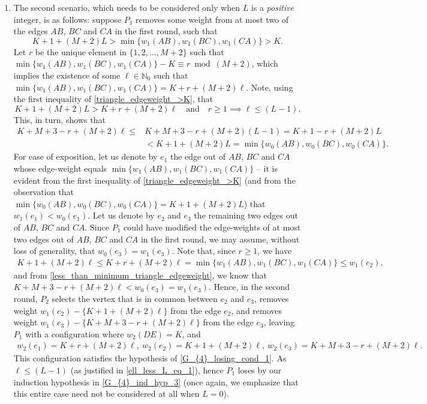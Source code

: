 \documentclass[11pt,reqno]{amsart}
\theoremstyle{definition}
\theoremstyle{definition}
\begin{document}
\begin{enumerate}
\item The second scenario, which needs to be considered only when $L$ is a \emph{positive} integer, is as follows: suppose $P_{1}$ removes some weight from at most two of the edges $AB$, $BC$ and $CA$ in the first round, such that 
\begin{equation}
K+1+(M+2)L > \min\{w_{1}(AB),w_{1}(BC),w_{1}(CA)\} > K.\label{triangle_edgeweight_>K}
\end{equation}
\sloppy Let $r$ be the unique element in $\{1,2,\ldots,M+2\}$ such that $\min\{w_{1}(AB),w_{1}(BC),w_{1}(CA)\}-K \equiv r \bmod (M+2)$, which implies the existence of some $\ell \in \mathbb{N}_{0}$ such that $\min\{w_{1}(AB),w_{1}(BC),w_{1}(CA)\}=K+r+(M+2)\ell$. Note, using the first inequality of \eqref{triangle_edgeweight_>K}, that
\begin{equation}
K+1+(M+2)L > K+r+(M+2)\ell \quad \text{and} \quad r \geqslant 1 \implies \ell \leqslant (L-1).\label{ell_less_L_eq_1}
\end{equation}
This, in turn, shows that 
\begin{align}
K+M+3-r+(M+2)\ell \leqslant{}& K+M+3-r+(M+2)(L-1)=K+1-r+(M+2)L\nonumber\\
{}&< K+1+(M+2)L=\min\{w_{0}(AB),w_{0}(BC),w_{0}(CA)\}.\label{less_than_minimum_triangle_edgeweight}
\end{align}
For ease of exposition, let us denote by $e_{1}$ the edge out of $AB$, $BC$ and $CA$ whose edge-weight equals $\min\{w_{1}(AB),w_{1}(BC),w_{1}(CA)\}$ -- it is evident from the first inequality of \eqref{triangle_edgeweight_>K} (and from the observation that $\min\{w_{0}(AB),w_{0}(BC),w_{0}(CA)\}=K+1+(M+2)L$) that $w_{1}(e_{1})<w_{0}(e_{1})$. Let us denote by $e_{2}$ and $e_{3}$ the remaining two edges out of $AB$, $BC$ and $CA$. Since $P_{1}$ could have modified the edge-weights of at most two edges out of $AB$, $BC$ and $CA$ in the first round, we may assume, without loss of generality, that $w_{0}(e_{3})=w_{1}(e_{3})$. Note that, since $r \geqslant 1$, we have
\begin{align}
K+1+(M+2)\ell \leqslant K+r+(M+2)\ell=\min\{w_{1}(AB),w_{1}(BC),w_{1}(CA)\}\leqslant w_{1}(e_{2}),\nonumber
\end{align}
and from \eqref{less_than_minimum_triangle_edgeweight}, we know that $K+M+3-r+(M+2)\ell < w_{0}(e_{3})=w_{1}(e_{3})$. Hence, in the second round, $P_{2}$ selects the vertex that is in common between $e_{2}$ and $e_{3}$, removes weight $w_{1}(e_{2})-\{K+1+(M+2)\ell\}$ from the edge $e_{2}$, and removes weight $w_{1}(e_{3})-\{K+M+3-r+(M+2)\ell\}$ from the edge $e_{3}$, leaving $P_{1}$ with a configuration where $w_{2}(DE)=K$, and  
\begin{align}
w_{2}(e_{1})=K+r+(M+2)\ell,\ w_{2}(e_{2})=K+1+(M+2)\ell,\ w_{2}(e_{3})=K+M+3-r+(M+2)\ell.\nonumber
\end{align} 
This configuration satisfies the hypothesis of \eqref{G_{4}_losing_cond_1}. As $\ell \leqslant (L-1)$ (as justified in \eqref{ell_less_L_eq_1}), hence $P_{1}$ loses by our induction hypothesis in \eqref{G_{4}_ind_hyp_3} (once again, we emphasize that this entire case need not be considered at all when $L=0$).


\end{enumerate}
\end{document}
